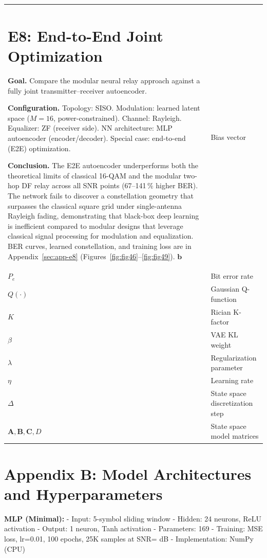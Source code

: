 {\begin{longtable}[]{@{}ll@{}}
\section{E8: End-to-End Joint Optimization}\label{sec:end-to-end-joint-optimization}

\textbf{Goal.}
Compare the modular neural relay approach against a fully joint transmitter--receiver
autoencoder.

\textbf{Configuration.}
Topology: SISO.
Modulation: learned latent space ($M{=}16$, power-constrained).
Channel: Rayleigh.
Equalizer: ZF (receiver side).
NN architecture: MLP autoencoder (encoder/decoder).
Special case: end-to-end (E2E) optimization.

\textbf{Conclusion.}
The E2E autoencoder underperforms both the theoretical limits of classical 16-QAM and
the modular two-hop DF relay across all SNR points (67--141\,\% higher BER).
The network fails to discover a constellation geometry that surpasses the classical
square grid under single-antenna Rayleigh fading, demonstrating that black-box deep
learning is inefficient compared to modular designs that leverage classical signal
processing for modulation and equalization.
BER curves, learned constellation, and training loss are in Appendix~\ref{sec:app-e8}
(Figures~\ref{fig:fig46}--\ref{fig:fig49}).
\(\mathbf{b}\) & Bias vector \\
\(P_e\) & Bit error rate \\
\(Q(\cdot)\) & Gaussian Q-function \\
\(K\) & Rician K-factor \\
\(\beta\) & VAE KL weight \\
\(\lambda\) & Regularization parameter \\
\(\eta\) & Learning rate \\
\(\Delta\) & State space discretization step \\
\(\mathbf{A}, \mathbf{B}, \mathbf{C}, D\) & State space model matrices \\
\end{longtable}
}

\section{Appendix B: Model Architectures and Hyperparameters}\label{sec:appendix-b-model-architectures-and-hyperparameters}

\textbf{MLP (Minimal):} - Input: 5-symbol sliding window - Hidden: 24 neurons, ReLU activation - Output: 1 neuron, Tanh activation - Parameters: 169 - Training: MSE loss, lr=0.01, 100 epochs, 25K samples at SNR=\cite{nazer2011compute, sun2018learning, vaswani2017attention} dB - Implementation: NumPy (CPU)

